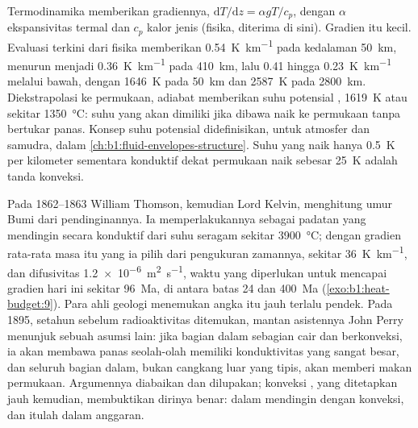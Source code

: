 Termodinamika memberikan gradiennya, $\mathrm dT/\mathrm dz = \alpha g T/c_p$, dengan $\alpha$ ekspansivitas termal dan $c_p$ kalor jenis (fisika, diterima di sini). Gradien itu kecil. Evaluasi terkini dari fisika  memberikan \qty{0.54}{K.km^{-1}} pada kedalaman \qty{50}{km}, menurun menjadi \qty{0.36}{K.km^{-1}} pada \qty{410}{km}, lalu 0.41 hingga \qty{0.23}{K.km^{-1}} melalui  bawah, dengan \qty{1646}{K} pada \qty{50}{km} dan \qty{2587}{K} pada \qty{2800}{km}.
Diekstrapolasi ke permukaan, adiabat memberikan suhu potensial , \qty{1619}{K} atau sekitar \qty{1350}{\degreeCelsius}: suhu yang akan dimiliki  jika dibawa naik ke permukaan tanpa bertukar panas. Konsep suhu potensial didefinisikan, untuk atmosfer dan samudra, dalam \cref{ch:b1:fluid-envelopes-structure}. Suhu yang naik hanya \qty{0.5}{K} per kilometer sementara  konduktif dekat permukaan naik sebesar \qty{25}{K} adalah tanda konveksi.

\begin{history}
Pada 1862--1863 William Thomson, kemudian Lord Kelvin, menghitung umur Bumi dari pendinginannya. Ia memperlakukannya sebagai padatan yang mendingin secara konduktif dari suhu seragam sekitar \qty{3900}{\degreeCelsius}; dengan gradien rata-rata masa itu yang ia pilih dari pengukuran zamannya, sekitar \qty{36}{K.km^{-1}}, dan difusivitas \qty{1.2e-6}{m^2.s^{-1}}, waktu yang diperlukan untuk mencapai gradien hari ini sekitar \qty{96}{Ma}, di antara batas 24 dan \qty{400}{Ma} (\cref{exo:b1:heat-budget:9}). Para ahli geologi menemukan angka itu jauh terlalu pendek. Pada 1895, setahun sebelum radioaktivitas ditemukan, mantan asistennya John Perry menunjuk sebuah asumsi lain: jika bagian dalam sebagian cair dan berkonveksi, ia akan membawa panas seolah-olah memiliki konduktivitas yang sangat besar, dan seluruh bagian dalam, bukan cangkang luar yang tipis, akan memberi makan  permukaan. Argumennya diabaikan dan dilupakan; konveksi , yang ditetapkan jauh kemudian, membuktikan dirinya benar:  dalam mendingin dengan konveksi, dan itulah  dalam anggaran. %
\end{history}

